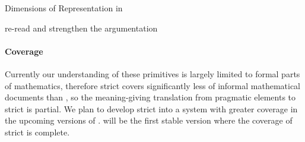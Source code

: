 \begin{omgroup}[id=syntax-semantics]{Dimensions of Representation in \omdoc}
\begin{newpart}{re-read and strengthen the argumentation}
\paragraph{Coverage} 
Currently our understanding of these primitives is largely limited to formal parts of
mathematics, therefore strict {} covers significantly less of informal
mathematical documents than {}, so the meaning-giving translation from
pragmatic \omdoc elements to strict \omdoc is partial. We plan to develop strict
\omdoc into a system with greater coverage in the upcoming versions of \omdoc.
{} will be the first stable version where the coverage of strict \omdoc is
complete.
\end{newpart}
\end{omgroup}


